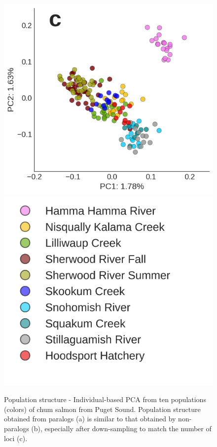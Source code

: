 \documentclass[12pt, one column]{article}
\begin{document}
\begin{figure}[H]
\includegraphics[scale=.35]{figures/PCA_c.png}
\includegraphics[scale=.45]{figures/PCA_legend.png}
\caption[Individual-based PCAs showing population structure]{Population structure - Individual-based PCA from ten populations (colors) of chum salmon from Puget Sound.  Population structure obtained from paralogs (a) is similar to that obtained by non-paralogs (b), especially after down-sampling to match the number of loci (c).}
\end{figure}
\end{document}
